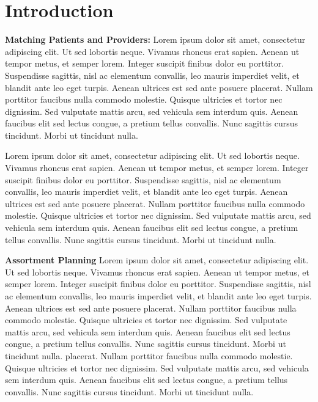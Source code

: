 \section{Introduction}
\textbf{Matching Patients and Providers:}
Lorem ipsum dolor sit amet, consectetur adipiscing elit. Ut sed lobortis neque. Vivamus rhoncus erat sapien. Aenean ut tempor metus, et semper lorem. Integer suscipit finibus dolor eu porttitor. Suspendisse sagittis, nisl ac elementum convallis, leo mauris imperdiet velit, et blandit ante leo eget turpis. Aenean ultrices est sed ante posuere placerat. Nullam porttitor faucibus nulla commodo molestie. Quisque ultricies et tortor nec dignissim. Sed vulputate mattis arcu, sed vehicula sem interdum quis. Aenean faucibus elit sed lectus congue, a pretium tellus convallis. Nunc sagittis cursus tincidunt. Morbi ut tincidunt nulla.

Lorem ipsum dolor sit amet, consectetur adipiscing elit. Ut sed lobortis neque. Vivamus rhoncus erat sapien. Aenean ut tempor metus, et semper lorem. Integer suscipit finibus dolor eu porttitor. Suspendisse sagittis, nisl ac elementum convallis, leo mauris imperdiet velit, et blandit ante leo eget turpis. Aenean ultrices est sed ante posuere placerat. Nullam porttitor faucibus nulla commodo molestie. Quisque ultricies et tortor nec dignissim. Sed vulputate mattis arcu, sed vehicula sem interdum quis. Aenean faucibus elit sed lectus congue, a pretium tellus convallis. Nunc sagittis cursus tincidunt. Morbi ut tincidunt nulla.

\textbf{Assortment Planning}
Lorem ipsum dolor sit amet, consectetur adipiscing elit. Ut sed lobortis neque. Vivamus rhoncus erat sapien. Aenean ut tempor metus, et semper lorem. Integer suscipit finibus dolor eu porttitor. Suspendisse sagittis, nisl ac elementum convallis, leo mauris imperdiet velit, et blandit ante leo eget turpis. Aenean ultrices est sed ante posuere placerat. Nullam porttitor faucibus nulla commodo molestie. Quisque ultricies et tortor nec dignissim. Sed vulputate mattis arcu, sed vehicula sem interdum quis. Aenean faucibus elit sed lectus congue, a pretium tellus convallis. Nunc sagittis cursus tincidunt. Morbi ut tincidunt nulla.
placerat. Nullam porttitor faucibus nulla commodo molestie. Quisque ultricies et tortor nec dignissim. Sed vulputate mattis arcu, sed vehicula sem interdum quis. Aenean faucibus elit sed lectus congue, a pretium tellus convallis. Nunc sagittis cursus tincidunt. Morbi ut tincidunt nulla.

